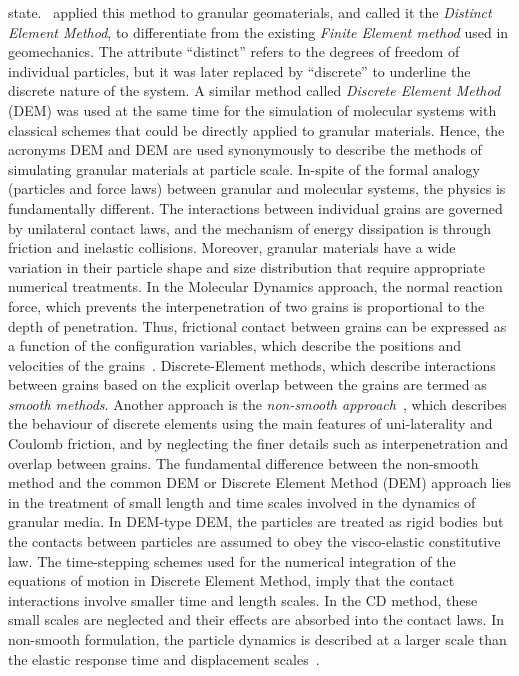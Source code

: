 state.~\citet{Cundall1979} applied this 
method to granular geomaterials, and called it the \textit{Distinct Element 
Method}, to 
differentiate from the existing \textit{Finite Element method} used in 
geomechanics. The attribute 
``distinct'' refers to the degrees of freedom of individual particles, but it 
was later replaced 
by 
``discrete'' to underline the discrete nature of the system. A similar method 
called 
\textit{Discrete Element Method} (DEM) was used at the same time for the 
simulation of molecular 
systems 
with classical schemes that could be directly applied to granular materials. 
Hence, the acronyms 
DEM 
and DEM are used synonymously to describe the methods of simulating granular 
materials at particle 
scale. In-spite of the formal analogy (particles and force laws) between 
granular and molecular 
systems, the physics is fundamentally different. The interactions between 
individual grains are 
governed by unilateral contact laws, and the mechanism of energy dissipation is 
through friction 
and inelastic collisions. Moreover, granular materials have a wide variation in 
their particle 
shape and size distribution that require appropriate numerical treatments. In 
the Molecular 
Dynamics approach, the normal reaction force, which prevents the 
interpenetration of two grains is 
proportional to the depth of penetration. Thus, frictional contact between 
grains can be expressed 
as a function of the configuration variables, which describe the positions and 
velocities of the 
grains~\citep{Radjai2011}. Discrete-Element methods, which describe 
interactions between grains 
based on the explicit overlap between the grains are termed as \textit{smooth 
methods}. Another 
approach is the \textit{non-smooth approach}~\citep{Jean1999}, which describes 
the behaviour of 
discrete elements using the main features of uni-laterality and Coulomb 
friction, and by 
neglecting 
the finer details such as interpenetration and overlap between grains. The 
fundamental difference 
between the non-smooth method and the common DEM or Discrete Element Method 
(DEM) approach lies in 
the 
treatment of small length and time scales involved in the dynamics of granular 
media. In DEM-type 
DEM, the particles are treated as rigid bodies but the contacts between 
particles are assumed to 
obey the visco-elastic constitutive law. The time-stepping schemes used for the 
numerical 
integration of the equations of motion in Discrete Element Method, imply that 
the contact 
interactions 
involve smaller time and length scales. In the CD method, these small scales 
are neglected and 
their effects are absorbed into the contact laws. In non-smooth formulation, 
the particle dynamics 
is described at a larger scale than the elastic response time and displacement 
scales~\citep{Jean1999, Radjai2009}. 


